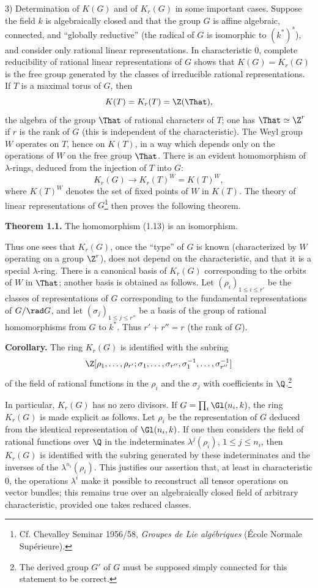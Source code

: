 3) Determination of $K(G)$ and of $K_r(G)$ in some important cases. Suppose the field $k$ is algebraically closed and that the group $G$ is affine algebraic, connected, and ``globally reductive'' (the radical of $G$ is isomorphic to $(k^*)^s$), and consider only rational linear representations. In characteristic $0$, complete reducibility of rational linear representations of $G$ shows that $K(G)=K_r(G)$ is the free group generated by the classes of irreducible rational representations. If $T$ is a maximal torus of $G$, then
\[
K(T)=K_r(T)=\Z(\That),
\]
the algebra of the group $\That$ of rational characters of $T$; one has $\That\simeq \Z^r$ if $r$ is the rank of $G$ (this is independent of the characteristic). The Weyl group $W$ operates on $T$, hence on $K(T)$, in a way which depends only on the operations of $W$ on the free group $\That$. There is an evident homomorphism of $\lambda$-rings, deduced from the injection of $T$ into $G$:
\begin{equation}\tag{1.13}
K_r(G)\longrightarrow K_r(T)^W=K(T)^W,
\end{equation}
where $K(T)^W$ denotes the set of fixed points of $W$ in $K(T)$. The theory of linear representations of $G$\footnote{Cf. Chevalley Seminar 1956/58, \emph{Groupes de Lie algébriques} (École Normale Supérieure).} then proves the following theorem.

\textbf{Theorem 1.1.} The homomorphism (1.13) is an isomorphism.

Thus one sees that $K_r(G)$, once the ``type'' of $G$ is known (characterized by $W$ operating on a group $\Z^r$), does not depend on the characteristic, and that it is a special $\lambda$-ring. There is a canonical basis of $K_r(G)$ corresponding to the orbits of $W$ in $\That$; another basis is obtained as follows. Let $(\rho_i)_{1\leq i\leq r'}$ be the classes of representations of $G$ corresponding to the fundamental representations of $G/\rad G$, and let $(\sigma_j)_{1\leq j\leq r''}$ be a basis of the group of rational homomorphisms from $G$ to $k^*$. Thus $r'+r''=r$ (the rank of $G$).

\textbf{Corollary.} The ring $K_r(G)$ is identified with the subring
\[
\Z[\rho_1,\ldots,\rho_{r'};\sigma_1,\ldots,\sigma_{r''},\sigma_1^{-1},\ldots,\sigma_{r''}^{-1}]
\]
of the field of rational functions in the $\rho_i$ and the $\sigma_j$ with coefficients in $\Q$.\footnote{The derived group $G'$ of $G$ must be supposed simply connected for this statement to be correct.}

In particular, $K_r(G)$ has no zero divisors. If $G=\prod_i\Gl(n_i,k)$, the ring $K_r(G)$ is made explicit as follows. Let $\rho_i$ be the representation of $G$ deduced from the identical representation of $\Gl(n_i,k)$. If one then considers the field of rational functions over $\Q$ in the indeterminates $\lambda^j(\rho_i)$, $1\leq j\leq n_i$, then $K_r(G)$ is identified with the subring generated by these indeterminates and the inverses of the $\lambda^{n_i}(\rho_i)$. This justifies our assertion that, at least in characteristic $0$, the operations $\lambda^i$ make it possible to reconstruct all tensor operations on vector bundles; this remains true over an algebraically closed field of arbitrary characteristic, provided one takes reduced classes.


